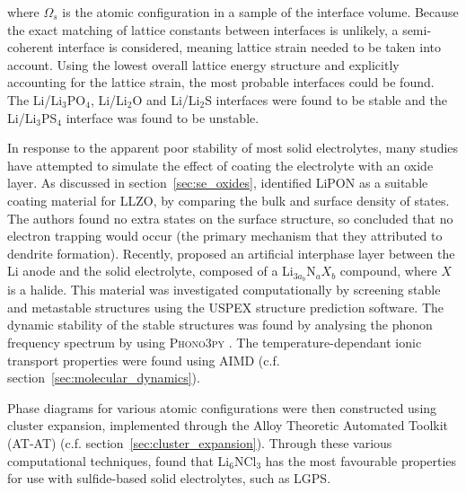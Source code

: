 \documentclass[../main.tex]{subfiles}
\begin{document}
where $\Omega_s$ is the atomic configuration in a sample of the interface volume. Because the exact matching of lattice constants between interfaces is unlikely, a semi-coherent interface is considered, meaning lattice strain needed to be taken into account. Using the lowest overall lattice energy structure and explicitly accounting for the lattice strain, the most probable interfaces could be found. The Li/Li$_3$PO$_4$, Li/Li$_2$O and Li/Li$_2$S interfaces were found to be stable and the Li/Li$_3$PS$_4$ interface was found to be unstable.\cite{Lepley2015}

In response to the apparent poor stability of most solid electrolytes, many studies have attempted to simulate the effect of coating the electrolyte with an oxide layer.\cite{Zhang2020directvis, Xiao2019coat, Tian2018} As discussed in section~\ref{sec:se_oxides}, \citeauthor{Tian2018} identified LiPON as a suitable coating material for LLZO, by comparing the bulk and surface density of states.\cite{Tian2018} The authors found no extra states on the surface structure, so concluded that no electron trapping would occur (the primary mechanism that they attributed to dendrite formation). Recently, \citeauthor{Sang2020} proposed an artificial interphase layer between the Li anode and the solid electrolyte, composed of a Li$_{3a_b}$N$_{a}X_{b}$ compound, where $X$ is a halide.\cite{Sang2020} This material was investigated computationally by screening stable and metastable structures using the USPEX structure prediction software.\cite{Glass2006, Oganov2006} The dynamic stability of the stable structures was found by analysing the phonon frequency spectrum by using \textsc{Phono3py} \cite{Parlinski1997, Togo2008,togo_distributions_2015}. The temperature-dependant ionic transport properties were found using AIMD (c.f. section~\ref{sec:molecular_dynamics}).

Phase diagrams for various atomic configurations were then constructed using cluster expansion, implemented through the Alloy Theoretic Automated Toolkit (AT-AT) (c.f. section~\ref{sec:cluster_expansion}).\cite{Hart2008, VandeWalle2002} Through these various computational techniques, \citeauthor{Sang2020} found that Li$_6$NCl$_3$ has the most favourable properties for use with sulfide-based solid electrolytes, such as LGPS.\cite{Sang2020}
\end{document}
